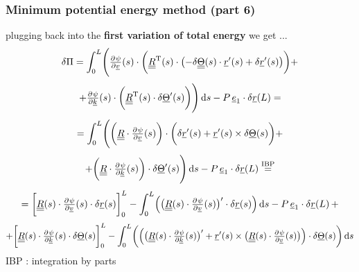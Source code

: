 \begin{frame}
  \frametitle{Minimum potential energy method (part 6)}
  
  plugging back into the \textbf{first variation of total energy} we get ...
  \begin{displaymath}
    \delta \Pi =
    \int_0^L \Biggl(
    \pd{\psi}{\underline{v}}(s) \cdot
    \biggl(
    \doubleunderline{R}^{\mathrm{T}}(s) \cdot
    \bigl( - \delta \doubleunderline{\Theta}(s) \cdot \underline{r}^{\prime}(s) + \delta \underline{r}^{\prime}(s) \bigr)
    \biggr) +
  \end{displaymath}
  \begin{displaymath}
    + \pd{\psi}{\underline{k}}(s) \cdot 
    \biggl(
    \doubleunderline{R}^{\mathrm{T}}(s) \cdot \delta \underline{\Theta}^{\prime}(s)
    \biggr)
    \Biggr) \dif s
    - P \, \underline{e}_1 \cdot \delta \underline{r}(L) =
  \end{displaymath}
  \begin{displaymath}
    = \int_0^L \Biggl(
    \biggl( \doubleunderline{R} \cdot \pd{\psi}{\underline{v}}(s) \biggr) \cdot
    \biggl(
      \delta \underline{r}^{\prime}(s) +
      \underline{r}^{\prime}(s) \times \delta \underline{\Theta}(s)
    \biggr) +
  \end{displaymath}
  \begin{displaymath}
    + \biggl( \doubleunderline{R} \cdot \pd{\psi}{\underline{k}}(s) \biggr) \cdot
    \delta \underline{\Theta}^{\prime}(s)
    \Biggr) \dif s
    - P \, \underline{e}_1 \cdot \delta \underline{r}(L) \overset{\text{IBP}}{=}
  \end{displaymath}
  \begin{displaymath}
    = \biggl[ \doubleunderline{R}(s) \cdot \pd{\psi}{\underline{v}}(s) \cdot \delta \underline{r}(s) \biggr]_0^L -
    \int_0^L \Bigl(
      \bigl( \doubleunderline{R}(s) \cdot \pd{\psi}{\underline{v}}(s) \bigr)^{\prime} \cdot \delta \underline{r}(s)
    \Bigr) \dif s -P \, \underline{e}_1 \cdot \delta \underline{r}(L) \, +
  \end{displaymath}
  \begin{displaymath}
    + \biggl[ \doubleunderline{R}(s) \cdot \pd{\psi}{\underline{k}}(s) \cdot \delta \underline{\Theta}(s) \biggr]_0^L -
    \int_0^L \biggl(
      \Bigl(
        \bigl( \doubleunderline{R}(s) \cdot \pd{\psi}{\underline{k}}(s) \bigr)^{\prime} +
        \underline{r}^{\prime}(s) \times \bigl( \doubleunderline{R}(s) \cdot \pd{\psi}{\underline{v}}(s)  \bigr)
      \Bigr) \cdot \delta \underline{\Theta}(s)
    \biggr) \dif s
  \end{displaymath}
  IBP : integration by parts
\end{frame}



